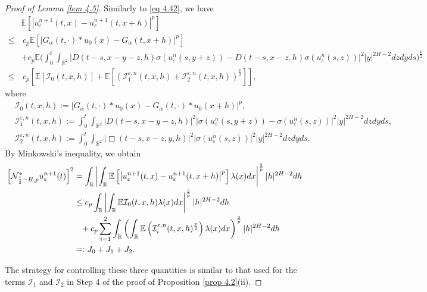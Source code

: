 \documentclass[11pt,reqno]{amsart}
\numberwithin{equation}{section}
\newcommand{\1}{{\bf 1}}
\newcommand{\2}{{\bf 2}}
\begin{document}
\begin{proof}[Proof of Lemma \ref{lem 4.5}]
   Similarly to \eqref{eq 4.42}, we have
\begin{align*}
&\mathbb{E}\left[\left|u_{\varepsilon}^{n+1}(t,x)-u_{\varepsilon}^{n+1}(t,x+h)\right|^p\right]\\
 \le &\,  c_p\mathbb{E}\left[\left|G_{\alpha}(t,\cdot)*u_0(x)-G_{\alpha}(t,x+h)\right|^p\right]\\
&+ c_p\mathbb{E}\Bigg(\int_0^t\int_{\mathbb{R}^2}\Big|D(t-s,x-y-z,h)\sigma(u_{\varepsilon}^n(s,y+z)) 
  -D(t-s,x-z,h)\sigma(u_{\varepsilon}^n(s,z))\Big|^2|y|^{2H-2}dzdyds\Bigg)^{\frac{p}2}\\
 \le  &\, c_p\left[\mathbb{E}\left[\mathcal{I}_0(t,x,h)\right]+\mathbb{E}\left[\left(\mathcal{I}_1^{\varepsilon,n}(t, x, h)+\mathcal{I}_2^{\varepsilon,n}(t, x, h)\right)^{\frac{p}2}\right]\right],\end{align*}
where
\begin{align*}
&\mathcal{I}_0(t,x,h):=\left|G_{\alpha}(t,\cdot)*u_0(x)-G_{\alpha}(t,\cdot)*u_0(x+h)\right|^p,\\
&\mathcal{I}_1^{\varepsilon,n}(t,x,h):=\int_0^t\int_{\mathbb{R}^2}\left|D(t-s,x-y-z,h)\right|^2
\left|\sigma(u_{\varepsilon}^n(s,y+z))-\sigma(u_{\varepsilon}^n(s,z))\right|^2|y|^{2H-2}dzdyds,\\
&\mathcal{I}_2^{\varepsilon,n}(t,x,h):=\int_0^t\int_{\mathbb{R}^2}\left|\Box(t-s,x-z,y,h)\right|^2
\left|\sigma(u_{\varepsilon}^n(s,z))\right|^2|y|^{2H-2}dzdyds.
\end{align*}
By Minkowski's inequality, we obtain
\begin{equation}\label{eq 4.47}
\begin{split}
\left[\mathcal{N}_{\frac12-H,p}^*u_{\varepsilon}^{n+1}(t)\right]^2&=\int_{\mathbb{R}}\left|\int_{\mathbb{R}}\mathbb{E}\left[\left|
u_{\varepsilon}^{n+1}(t,x)-u_{\varepsilon}^{n+1}(t,x+h)\right|^p\right]\lambda(x)dx\right|^{\frac2p}|h|^{2H-2}dh \\
&\le  c_p\int_{\mathbb{R}}\left|\int_{\mathbb{R}}\mathbb{E}\mathcal{I}_0(t,x,h)\lambda(x)dx\right|^{\frac2p}|h|^{2H-2}dh \\
&\hskip8pt+c_p\sum_{i=1}^2\int_{\mathbb{R}}\left(\int_{\mathbb{R}}\mathbb{E}\left(\mathcal{I}_i^{\varepsilon,n}(t,x,h)^{\frac{p}2}\right)\lambda(x)dx\right)^{\frac2p}|h|^{2H-2}dh \\
&=:J_0+J_1+J_2.
\end{split}
\end{equation}

 The strategy for controlling  these three quantities is similar to that used  for the terms $\mathcal{I}_1 $ and  $\mathcal{I}_2 $ in Step 4 of the proof of Proposition \ref{prop 4.2}(ii).
 

\end{proof}
\end{document}
